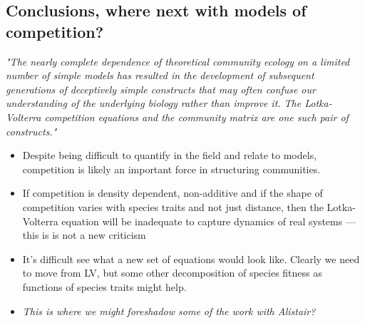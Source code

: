 \documentclass[a4paper,11pt]{article}
\begin{document}
\subsection{Conclusions, where next with models of competition?}

\emph{"The nearly complete dependence of theoretical community ecology on a
limited number of simple models has resulted in the development of subsequent
generations of deceptively simple constructs that may often confuse our
understanding of the underlying biology rather than improve it. The 
Lotka-Volterra competition equations and the community matrix are one such 
pair of constructs."} \citep{Neill-1974}

\begin{itemize}
\item Despite being difficult to quantify in the field and relate to
  models, competition is likely an important force in structuring
  communities.
\item If competition is density dependent, non-additive and if the
  shape of competition varies with species traits and not just
  distance, then the Lotka-Volterra equation will be inadequate to
  capture dynamics of real systems --- this is is not a new criticism
  \citep[e.g., see][: ``The nearly complete dependence of theoretical
  community ecology on a limited number of simple
  models'']{Neill-1974}
\item It's difficult see what a new set of equations would look like.
  Clearly we need to move from LV, but some other decomposition of
  species fitness as functions of species traits might help.
\item \textit{This is where we might foreshadow some of the work with
    Alistair?}
\end{itemize}
\end{document}
